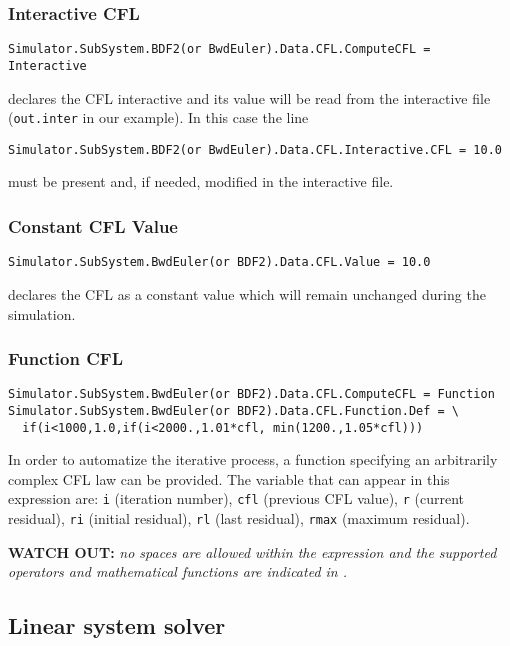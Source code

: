 \documentclass[11pt]{article}
\begin{document}
\subsubsection{Interactive CFL}

\begin{lstlisting}[breaklines]   
Simulator.SubSystem.BDF2(or BwdEuler).Data.CFL.ComputeCFL = Interactive
\end{lstlisting}
declares the CFL interactive and its value will be read from the interactive file ({\tt out.inter} in our example).
In this case the line
\begin{lstlisting}[breaklines]
Simulator.SubSystem.BDF2(or BwdEuler).Data.CFL.Interactive.CFL = 10.0
\end{lstlisting}
must be present and, if needed, modified in the interactive file.

\subsubsection{Constant CFL Value}

\begin{lstlisting}[breaklines]
Simulator.SubSystem.BwdEuler(or BDF2).Data.CFL.Value = 10.0 
\end{lstlisting}
declares the CFL as a constant value which will remain unchanged during the simulation.

\subsubsection{Function CFL}

\begin{lstlisting}[breaklines]   
Simulator.SubSystem.BwdEuler(or BDF2).Data.CFL.ComputeCFL = Function
Simulator.SubSystem.BwdEuler(or BDF2).Data.CFL.Function.Def = \
  if(i<1000,1.0,if(i<2000.,1.01*cfl, min(1200.,1.05*cfl)))
\end{lstlisting}
In order to automatize the iterative process, a function specifying an arbitrarily complex CFL law can be provided.
The variable that can appear in this expression are: {\tt i} (iteration number), {\tt cfl} (previous CFL value), 
{\tt r} (current residual), {\tt ri} (initial residual), {\tt rl} (last residual), 
{\tt rmax} (maximum residual).

{\bf WATCH OUT:} {\it no spaces are allowed within the expression and the supported operators and mathematical functions
  are indicated in \cite{FParser}.}

\subsection{Linear system solver}
\end{document}

